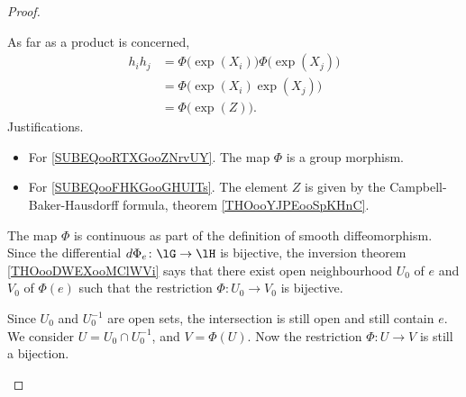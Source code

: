 \begin{proof}
\begin{subproof}
        As far as a product is concerned,
        \begin{subequations}
            \begin{align}
                h_ih_j&=\Phi\big( \exp(X_i) \big)\Phi\big( \exp(X_j) \big)\\
                &=\Phi\big( \exp(X_i)\exp(X_j) \big)    \label{SUBEQooRTXGooZNrvUY}\\
                &=\Phi\big( \exp(Z) \big).      \label{SUBEQooFHKGooGHUITs}
            \end{align}
        \end{subequations}
        Justifications.
        \begin{itemize}
            \item For \eqref{SUBEQooRTXGooZNrvUY}. The map \( \Phi\) is a group morphism.
            \item For \eqref{SUBEQooFHKGooGHUITs}. The element \( Z\) is given by the Campbell-Baker-Hausdorff formula, theorem \ref{THOooYJPEooSpKHnC}.
        \end{itemize}
    \spitem[Continuous]
        The map \( \Phi\) is continuous as part of the definition of smooth diffeomorphism.
        Since the differential \( d\Phi_e\colon \lG\to \lH\) is bijective, the inversion theorem \ref{THOooDWEXooMClWVi} says that there exist open neighbourhood \( U_0\) of \( e\) and \( V_0\) of \( \Phi(e)\) such that  the restriction \( \Phi\colon U_0\to V_0\) is bijective.

        Since \( U_0\) and \( U_0^{-1}\) are open sets, the intersection is still open and still contain \( e\). We consider \( U=U_0\cap U_0^{-1}\), and \( V=\Phi(U)\). Now the restriction \( \Phi\colon U\to V\) is still a bijection.


\end{subproof}
\end{proof}
